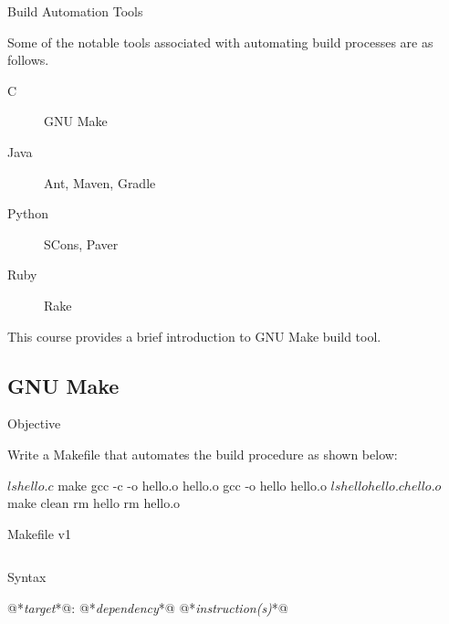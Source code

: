 \documentclass[compress]{beamer}
\begin{document}
\begin{slide}
	\begin{block}{Build Automation Tools}

	Some of the notable tools associated with automating build processes are as follows.

	\begin{description}
	\item[C] GNU Make
	\item[Java] Ant, Maven, Gradle
	\item[Python] SCons, Paver
	\item[Ruby] Rake
	\end{description}

	This course provides a brief introduction to GNU Make build tool.

	\end{block}
\end{slide}

\subsection{GNU Make}

\begin{slide}
	\begin{block}{Objective}

	Write a Makefile that automates the build procedure as shown below:

	\begin{terminal}
	$ ls
	hello.c
	$ make
	gcc -c -o hello.o hello.o
	gcc -o hello hello.o
	$ ls
	hello hello.c hello.o
	$ make clean
	rm hello
	rm hello.o
	\end{terminal}

	\end{block}
\end{slide}

\begin{slide}
	\begin{block}{Makefile v1}

	\inputminted[fontsize=\footnotesize, linenos]{text}{
		\resDirectory/make1.txt
	}

	\end{block}
\end{slide}

\begin{slide}
	\begin{block}{Syntax}

	\begin{terminal}
	@*\textit{target}*@: @*\textit{dependency}*@
	    @*\textit{instruction(s)}*@
	\end{terminal}

	\end{block}
\end{slide}
\end{document}
